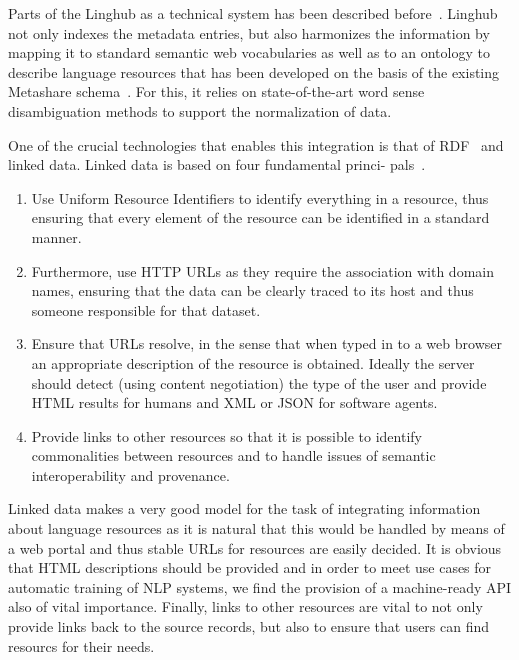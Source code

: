 \documentclass[smallextended]{svjour3}       %
\begin{document}
Parts of the Linghub as a technical system has been described
before~\cite{mccrae2015reconciling,mccrae2015linghub}. Linghub not
only indexes the metadata entries, but also harmonizes the information by
mapping it to standard semantic web vocabularies as well as to an ontology to
describe language resources that has been developed on the basis of the existing
Metashare schema~\cite{mccrae2015ontology}.
For this, it relies on state-of-the-art word sense disambiguation methods to
support the normalization of data. 

One of the crucial technologies that enables this integration is that of
RDF~\cite{klyne2006resource} and linked data. Linked data is based on four fundamental princi-
pals~\cite{bizer2009linked}.

\begin{enumerate}
    \item Use Uniform Resource Identifiers  to identify everything in a resource, thus
        ensuring that every element of the resource can be identified in a standard
        manner.
    \item Furthermore, use HTTP URLs as they require the association with domain names,
        ensuring that the data can be clearly traced to its host and thus someone
        responsible for that dataset.
    \item Ensure that URLs resolve, in the sense that when typed in to a web browser an
        appropriate description of the resource is obtained. Ideally the server should
        detect (using content negotiation) the type of the user and provide HTML
        results for humans and XML or JSON for software agents.
    \item Provide links to other resources so that it is possible to identify
        commonalities between resources and to handle issues of semantic
        interoperability and provenance.
\end{enumerate}

Linked data makes a very good model for the task of integrating information
about language resources as it is natural that this would be handled by means
of a web portal and thus stable URLs for resources are easily decided. It is
obvious that HTML descriptions should be provided and in order to meet
use cases for automatic training of NLP systems, we find the provision of a
machine-ready API also of vital importance. Finally, links to other resources
are vital to not only provide links back to the source records, but also to ensure
that users can find resourcs for their needs.
\end{document}
